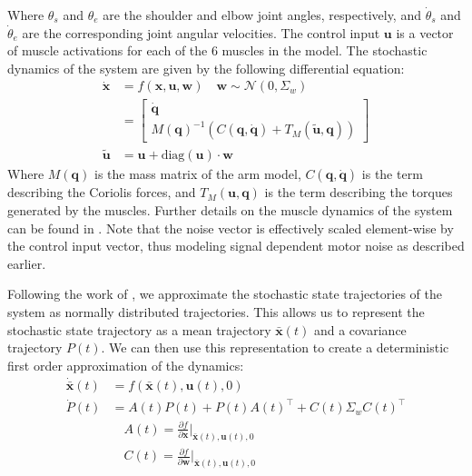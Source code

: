 \documentclass[letterpaper, 10pt, conference]{ieeeconf}
\begin{document}
Where $\theta_s$ and $\theta_e$ are the shoulder and elbow joint angles, respectively, and $\dot{\theta}_s$ and $\dot{\theta}_e$ are the corresponding joint angular velocities. The control input $\mathbf{u}$ is a vector of muscle activations for each of the 6 muscles in the model. The stochastic dynamics of the system are given by the following differential equation:
\begin{align}
    \dot{\mathbf{x}} &= f(\mathbf{x}, \mathbf{u}, \mathbf{w}) \quad \mathbf{w} \sim \mathcal{N}(0, \Sigma_w) \\
    &= \begin{bmatrix}
        \dot{\mathbf{q}} \\
        M(\mathbf{q})^{-1} \left(C(\mathbf{q}, \dot{\mathbf{q}}) + T_M(\tilde{\mathbf{u}}, \mathbf{q})\right)
    \end{bmatrix} \\
    \tilde{\mathbf{u}} &= \mathbf{u} + \text{diag}(\mathbf{u}) \cdot \mathbf{w}
\end{align}
Where $M(\mathbf{q})$ is the mass matrix of the arm model, $C(\mathbf{q}, \dot{\mathbf{q}})$ is the term describing the Coriolis forces, and $T_M(\mathbf{u}, \mathbf{q})$ is the term describing the torques generated by the muscles. Further details on the muscle dynamics of the system can be found in \cite{c7}. Note that the noise vector is effectively scaled element-wise by the control input vector, thus modeling signal dependent motor noise as described earlier.

Following the work of \cite{c7}, we approximate the stochastic state trajectories of the system as normally distributed trajectories. This allows us to represent the stochastic state trajectory as a mean trajectory $\mathbf{\bar{x}}(t)$ and a covariance trajectory $P(t)$. We can then use this representation to create a deterministic first order approximation of the dynamics: 
\begin{align*}
    \mathbf{\dot{\bar{x}}}(t) &= f(\mathbf{\bar{x}}(t), \mathbf{u}(t), 0) \\
    \dot{P}(t) &= A(t)P(t) + P(t)A(t)^\top + C(t) \Sigma_w C(t)^\top \\
    &\quad A(t) = \frac{\partial f}{\partial \mathbf{x}}\bigg|_{\mathbf{\bar{x}}(t), \mathbf{u}(t), 0} \\
    &\quad C(t) = \frac{\partial f}{\partial \mathbf{w}}\bigg|_{\mathbf{\bar{x}}(t), \mathbf{u}(t), 0}
\end{align*}
\end{document}
